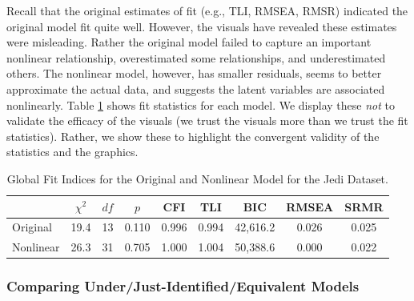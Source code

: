 \documentclass[
  english,
  man]{apa6}
\begin{document}
Recall that the original estimates of fit (e.g., TLI, RMSEA, RMSR) indicated the original model fit quite well. However, the visuals have revealed these estimates were misleading. Rather the original model failed to capture an important nonlinear relationship, overestimated some relationships, and underestimated others. The nonlinear model, however, has smaller residuals, seems to better approximate the actual data, and suggests the latent variables are associated nonlinearly. Table \ref{tab:tabresults} shows fit statistics for each model. We display these \emph{not} to validate the efficacy of the visuals (we trust the visuals more than we trust the fit statistics). Rather, we show these to highlight the convergent validity of the statistics and the graphics.

\begin{table}[tbp]

\begin{center}
\begin{threeparttable}

\caption{\label{tab:tabresults}Global Fit Indices for the Original and Nonlinear Model for the Jedi Dataset.}

\begin{tabular}{lcccccccc}
\toprule
 & $\chi^2$ & $df$ & $p$ & CFI & TLI & BIC & RMSEA & SRMR\\
\midrule
Original & 19.4 & 13 & 0.110 & 0.996 & 0.994 & 42,616.2 & 0.026 & 0.025\\
Nonlinear & 26.3 & 31 & 0.705 & 1.000 & 1.004 & 50,388.6 & 0.000 & 0.022\\
\bottomrule
\end{tabular}

\end{threeparttable}
\end{center}

\end{table}

\hypertarget{comparing-underjust-identifiedequivalent-models}{%
\subsubsection{Comparing Under/Just-Identified/Equivalent Models}\label{comparing-underjust-identifiedequivalent-models}}
\end{document}
